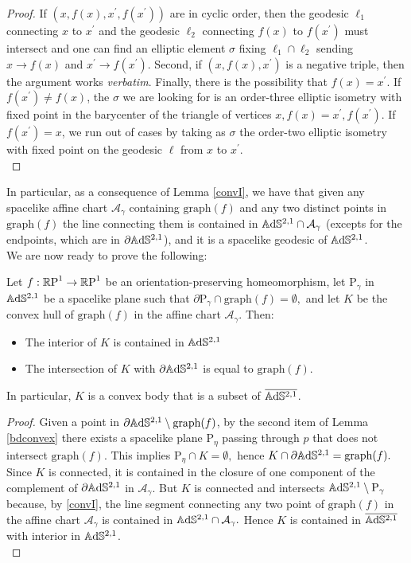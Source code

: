 \begin{proof}
If $(x,f(x),x^{\prime},f(x^{\prime}))$ are in cyclic order, then the geodesic $\ell_1$ connecting $x$ to $x^{\prime}$ and the geodesic $\ell_2$ connecting $f(x)$ to $f(x^{\prime})$ must intersect and one can find an elliptic element $\sigma$ fixing $\ell_1\cap\ell_2$ sending $x\to f(x)$ and $x^{\prime} \to f(x^{\prime}).$ Second, if $(x,f(x),x^{\prime} )$ is a negative triple, then the argument works \textit{verbatim}. Finally, there is the possibility that $f(x)=x^{\prime}$. If $f(x^{\prime})\neq f(x)$, the $\sigma$ we are looking for is an order-three elliptic isometry with fixed point in the barycenter of the triangle of vertices $x,f(x)=x^{\prime},f(x^{\prime})$. If $f(x^{\prime})=x$, we run out of cases by taking as $\sigma$ the order-two elliptic isometry with fixed point on the geodesic $\ell$ from $x$ to $x^{\prime}$. \\
\end{proof}

In particular, as a consequence of Lemma \ref{convI}, we have that given any spacelike affine chart $\mathcal{A}_\gamma$ containing $\text{graph}(f)$ and any two distinct points in $\text{graph}(f)$ the line connecting them is contained in $\A^{2,1}\cap\mathcal{A}_\gamma$ (excepts for the endpoints, which are in $\partial\A^{2,1}$), and it is a spacelike geodesic of $\A^{2,1}$.\\
We are now ready to prove the following: 
\begin{proposition}\label{convII}
    Let $f:\S\to\S$ be an orientation-preserving homeomorphism, let $\text{P}_\gamma$ in $\A^{2,1}$ be a spacelike plane such that $\partial\text{P}_\gamma\cap\text{graph}(f)=\emptyset,$ and let $K$ be the convex hull of $\text{graph}(f)$ in the affine chart $\mathcal{A}_\gamma$. Then: 
    \begin{itemize}
        \item The interior of $K$ is contained in $\A^{2,1}$
        \item The intersection of $K$ with $\partial\A^{2,1}$ is equal to $\text{graph}(f)$.
    \end{itemize}
    In particular, $K$ is a convex body that is a subset of $\overline{\A^{2,1}}$.
\end{proposition}
\begin{proof}
    Given a point in $\partial\A^{2,1}\setminus\text{graph}(f)$, by the second item of Lemma \ref{bdconvex} there exists a spacelike plane $\text{P}_\eta$ passing through $p$ that does not intersect $\text{graph}(f).$ This implies $\text{P}_\eta\cap K=\emptyset,$ hence $K\cap\partial\A^{2,1}=\text{graph}(f).$ Since $K$ is connected, it is contained in the closure of one component of the complement of $\partial\A^{2,1}$ in $\mathcal{A}_\gamma.$ But $K$ is connected and intersects $\A^{2,1}\setminus\text{P}_\gamma$ because, by \ref{convI}, the line segment connecting any two point of $\text{graph}(f)$ in the affine chart $\mathcal{A}_\gamma$ is contained in $\A^{2,1}\cap\mathcal{A}_\gamma.$ Hence $K$ is contained in $\overline{\A^{2,1}}$ with interior in $\A^{2,1}$. \\
\end{proof}

